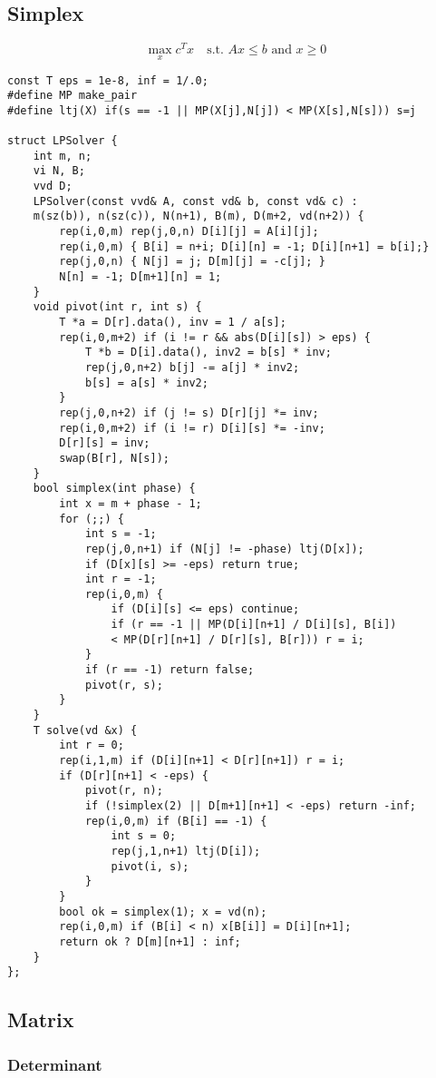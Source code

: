 \documentclass[a4paper,9pt]{article}
\begin{document}
\subsection{Simplex}

$$ \max_x c^T x \quad \text{s.t. } Ax \leqslant b \text{ and } x \geqslant 0 $$
\begin{lstlisting}
const T eps = 1e-8, inf = 1/.0;
#define MP make_pair
#define ltj(X) if(s == -1 || MP(X[j],N[j]) < MP(X[s],N[s])) s=j

struct LPSolver {
	int m, n;
	vi N, B;
	vvd D;
	LPSolver(const vvd& A, const vd& b, const vd& c) :
	m(sz(b)), n(sz(c)), N(n+1), B(m), D(m+2, vd(n+2)) {
		rep(i,0,m) rep(j,0,n) D[i][j] = A[i][j];
		rep(i,0,m) { B[i] = n+i; D[i][n] = -1; D[i][n+1] = b[i];}
		rep(j,0,n) { N[j] = j; D[m][j] = -c[j]; }
		N[n] = -1; D[m+1][n] = 1;
	}
	void pivot(int r, int s) {
		T *a = D[r].data(), inv = 1 / a[s];
		rep(i,0,m+2) if (i != r && abs(D[i][s]) > eps) {
			T *b = D[i].data(), inv2 = b[s] * inv;
			rep(j,0,n+2) b[j] -= a[j] * inv2;
			b[s] = a[s] * inv2;
		}
		rep(j,0,n+2) if (j != s) D[r][j] *= inv;
		rep(i,0,m+2) if (i != r) D[i][s] *= -inv;
		D[r][s] = inv;
		swap(B[r], N[s]);
	}
	bool simplex(int phase) {
		int x = m + phase - 1;
		for (;;) {
			int s = -1;
			rep(j,0,n+1) if (N[j] != -phase) ltj(D[x]);
			if (D[x][s] >= -eps) return true;
			int r = -1;
			rep(i,0,m) {
				if (D[i][s] <= eps) continue;
				if (r == -1 || MP(D[i][n+1] / D[i][s], B[i])
				< MP(D[r][n+1] / D[r][s], B[r])) r = i;
			}
			if (r == -1) return false;
			pivot(r, s);
		}
	}
	T solve(vd &x) {
		int r = 0;
		rep(i,1,m) if (D[i][n+1] < D[r][n+1]) r = i;
		if (D[r][n+1] < -eps) {
			pivot(r, n);
			if (!simplex(2) || D[m+1][n+1] < -eps) return -inf;
			rep(i,0,m) if (B[i] == -1) {
				int s = 0;
				rep(j,1,n+1) ltj(D[i]);
				pivot(i, s);
			}
		}
		bool ok = simplex(1); x = vd(n);
		rep(i,0,m) if (B[i] < n) x[B[i]] = D[i][n+1];
		return ok ? D[m][n+1] : inf;
	}
};
\end{lstlisting}

\subsection{Matrix}

\subsubsection{Determinant}
\end{document}
